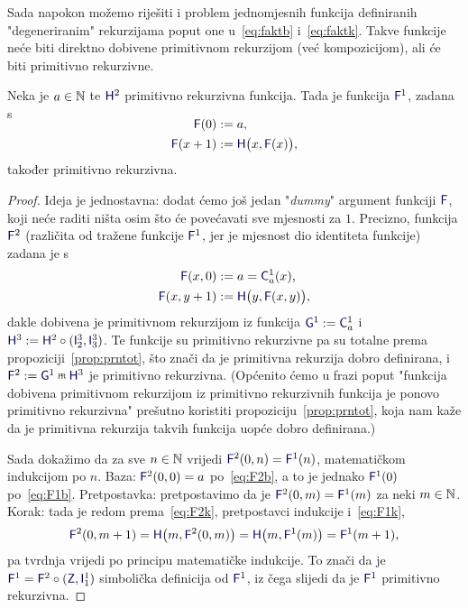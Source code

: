 Sada napokon možemo riješiti i problem jednomjesnih funkcija definiranih "degeneriranim" rekurzijama poput one u~\eqref{eq:faktb} i~\eqref{eq:faktk}. Takve funkcije neće biti direktno dobivene primitivnom rekurzijom (već kompozicijom), ali će biti primitivno rekurzivne.

\begin{propozicija}[{name=[jednomjesna funkcija primitivnom rekurzijom]}]\label{prop:F1prn}
Neka je $a\in{\mathbb N}$ te $\f H^2$ primitivno rekurzivna funkcija.
    \newline Tada je funkcija $\f F^1$, zadana s
\begin{align}
\SwapAboveDisplaySkip
\label{eq:F1b}
    \f F(0)&:=a\text,\\
\label{eq:F1k}
    \f F(x+1)&:=\f H\bigl(x,\f F(x)\bigr)\text,
\end{align}
također primitivno rekurzivna.
\end{propozicija}
\begin{proof}
Ideja je jednostavna: dodat ćemo još jedan "\!\emph{dummy}" argument funkciji $\f F$, koji neće raditi ništa osim što će povećavati sve mjesnosti za $1$. Precizno, funkcija $\f F^2$ (različita od tražene funkcije $\f F^1$\!, jer je mjesnost dio identiteta funkcije) zadana je s
\begin{align}
\label{eq:F2b}
    \f F(x,0)&:=a=\f C_a^1(x)\text,\\
\label{eq:F2k}
    \f F(x,y+1)&:=\f H\bigl(y,\f F(x,y)\bigr)\text,
\end{align}
dakle dobivena je primitivnom rekurzijom iz funkcija $\f G^1:=\f C_a^1$ i $\f H^3:=\f H^2\circ(\f I_2^3,\f I_3^3)$. Te funkcije su primitivno rekurzivne pa su totalne prema propoziciji~\ref{prop:prntot}, što znači da je primitivna rekurzija dobro definirana, i $\f F^2:=\f G^1\pr\f H^3$ je primitivno rekurzivna. (Općenito ćemo u frazi poput "funkcija dobivena primitivnom rekurzijom iz primitivno rekurzivnih funkcija je ponovo primitivno rekurzivna" prešutno koristiti propoziciju~\ref{prop:prntot}, koja nam kaže da je primitivna rekurzija takvih funkcija uopće dobro definirana.)

Sada dokažimo da za sve $n\in{\mathbb N}$ vrijedi $\f F^2(0,n)=\f F^1(n)$, matematičkom indukcijom po $n$. Baza: $\f F^2(0,0)=a$ po~\eqref{eq:F2b}, a to je jednako $\f F^1(0)$ po~\eqref{eq:F1b}. Pretpostavka: pretpostavimo da je $\f F^2(0,m)=\f F^1(m)$ za neki $m\in{\mathbb N}$. Korak: tada je redom prema~\eqref{eq:F2k}, pretpostavci indukcije i~\eqref{eq:F1k},
\begin{equation}
    \f F^2(0,m+1)=\f H\bigl(m,\f F^2(0,m)\bigr)=\f H\bigl(m,\f F^1(m)\bigr)=\f F^1(m+1)\text,
\end{equation}
pa tvrdnja vrijedi po principu matematičke indukcije. To znači da je $\f F^1=\f F^2\circ(\f Z,\f I_1^1)$ simbolička definicija od $\f F^1$, iz čega slijedi da je $\f F^1$ primitivno rekurzivna.
\end{proof}

